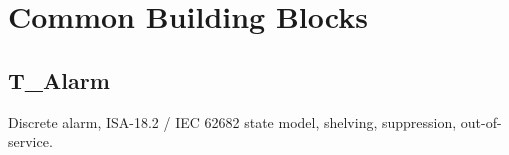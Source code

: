 \section{Common Building Blocks}

\subsection{T\_Alarm}\label{sec:pclib-t-alarm}

Discrete alarm, ISA-18.2 /\allowbreak{} IEC 62682 state model, shelving, suppression, out-of-service.

\par{}\par

